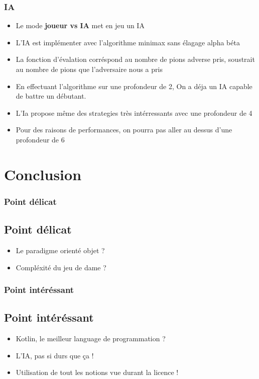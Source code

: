 \documentclass{beamer}
\begin{document}
\begin{frame}
  \frametitle{IA}

  \begin{itemize}
    \item Le mode \textbf{joueur vs IA} met en jeu un IA 
    \item L'IA est implémenter avec l'algorithme minimax sans élagage alpha béta
    \item La fonction d'évalation corréspond au nombre de pions adverse pris, 
    soustrait au nombre de pions que l'adversaire nous a pris
    \item En effectuant l'algorithme sur une profondeur de 2,
    On a déja un IA capable de battre un débutant.
    \item L'Ia propose même des strategies très intérressants avec une profondeur de 4
    \item Pour des raisons de performances, 
    on pourra pas aller au dessus d'une profondeur de 6
  \end{itemize}

\end{frame}
%
%
\section{Conclusion}

\begin{frame}
  \frametitle{Point délicat}
  \subsection{Point délicat}
  \begin{itemize}
    \item Le paradigme orienté objet ?
    \item Compléxité du jeu de dame ?
  \end{itemize}

\end{frame}

\begin{frame}
  \frametitle{Point intéréssant}
  \subsection{Point intéréssant}
  \begin{itemize}
    \item Kotlin, le meilleur language de programmation ?
    \item L'IA, pas si durs que ça !
    \item Utilisation de tout les notions vue durant la licence !
  \end{itemize}

\end{frame}
\end{document}
